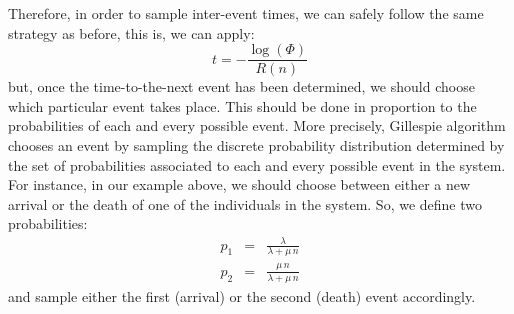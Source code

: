 \documentclass{article}
\begin{document}
Therefore, in order to sample inter-event times, we can safely follow the same strategy as before, this is, we can apply:
\begin{equation}
t     = -\frac{\log(\Phi)}{R(n)}
\label{Random_Time_General}
\end{equation}
but, once the time-to-the-next event has been determined, we should choose which particular event takes place. This should be done in proportion to the probabilities of each and every possible event. More precisely, Gillespie algorithm chooses an event by sampling the discrete probability distribution determined by the set of probabilities associated to each and every possible event in the system. For instance, in our example above, we should choose between either a new arrival or the death of one of the individuals in the system. So, we define two probabilities:
\begin{eqnarray}
p_1 &=& \frac{\lambda}{\lambda + \mu\,n} \nonumber \\
p_2 &=& \frac{\mu\,n}{\lambda + \mu\,n}  \label{p_1p_2}
\end{eqnarray}
and sample either the first (arrival) or the second (death) event accordingly. 
\smallskip
\end{document}
